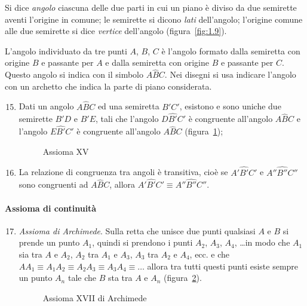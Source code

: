 \begin{center}
 
\end{center}

\begin{definizione}
Si dice \emph{angolo} ciascuna delle due parti in cui un piano è diviso da due semirette aventi l'origine in comune; le semirette si dicono \emph{lati} dell'angolo; l'origine comune alle due semirette si dice \emph{vertice} dell'angolo (figura~\ref{fig:1.9}).
\end{definizione}
\begin{figure*}[b,t,h]
\centering  
\caption{Le semirette $r$ e $s$, aventi l'origine $V$ comune, individuano due regioni del piano ognuna delle quali è detta \emph{angolo}.}\label{fig:1.9}
\end{figure*}

L'angolo individuato da tre punti $A$, $B$, $C$ è l'angolo formato dalla semiretta con origine $B$ e passante per $A$ e dalla semiretta con origine $B$ e passante per $C$. Questo angolo si indica con il simbolo $A\widehat{B}C$. Nei disegni si usa indicare l'angolo con un archetto che indica la parte di piano considerata.

\begin{enumerate}[label=\Roman{*}.]
\setcounter{enumi}{14}
\item Dati un angolo $A\widehat{B}C$ ed una semiretta $B'C'$, esistono e sono uniche due semirette $B'D$ e $B'E$, tali che l'angolo $D\widehat{B'}C'$ è congruente all'angolo $A\widehat{B}C$ e l'angolo $E\widehat{B'}C'$ è congruente all'angolo $A\widehat{B}C$ (figura~\ref{fig:1.10});
\begin{figure}[b,t,h]
 \centering 
 \caption{Assioma XV}\label{fig:1.10}
\end{figure}
\item La relazione di congruenza tra angoli è transitiva, cioè se  $A'\widehat{B'}C'$ e  $A''\widehat{B''}C''$ sono congruenti ad $A\widehat{B}C$, allora  $A'\widehat{B'}C' \equiv A''\widehat{B''}C''$.
\end{enumerate}

\paragraph{Assioma di continuità}

\begin{enumerate}[label=\Roman{*}.]
\setcounter{enumi}{16}
\item \emph{Assioma di Archimede}. Sulla retta che unisce due punti qualsiasi $A$ e $B$ si prende un punto $A_1$, quindi si prendono i punti $A_2$, $A_3$, $A_4$, \ldots in modo che $A_1$ sia tra $A$ e $A_2$, $A_2$ tra $A_1$ e $A_3$, $A_3$ tra $A_2$ e $A_4$, ecc. e che  $AA_1\equiv A_1A_2\equiv A_2A_3\equiv A_3A_4\equiv\ldots$ allora tra tutti questi punti esiste sempre un punto $A_n$ tale che $B$ sta tra $A$ e $A_n$ (figura~\ref{fig:1.11}).
\begin{figure}[b,t,h]
 \centering 
 \caption{Assioma XVII di Archimede}\label{fig:1.11}
\end{figure}
\end{enumerate}


